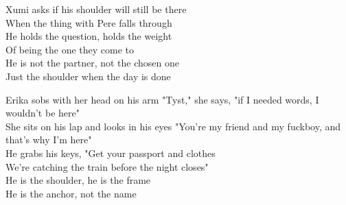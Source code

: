 \begin{lyrics}
Xumi asks if his shoulder will still be there\\
When the thing with Pere falls through\\
He holds the question, holds the weight\\
Of being the one they come to\\
He is not the partner, not the chosen one\\
Just the shoulder when the day is done

Erika sobs with her head on his arm
"Tyst," she says, "if I needed words, I wouldn't be here"\\
She sits on his lap and looks in his eyes
"You're my friend and my fuckboy, and that's why I'm here"\\
He grabs his keys, "Get your passport and clothes\\
We're catching the train before the night closes"\\
He is the shoulder, he is the frame\\
He is the anchor, not the name
\end{lyrics}

